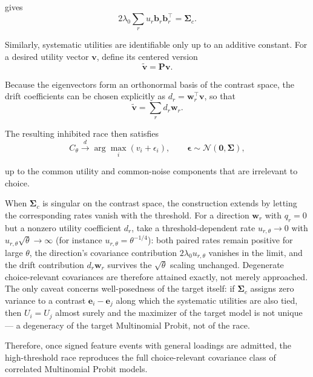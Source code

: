 \documentclass[
  man,
  floatsintext,
  longtable,
  a4paper,
  nolmodern,
  notxfonts,
  notimes,
  colorlinks=true,linkcolor=blue,citecolor=blue,urlcolor=blue]{apa7}
\begin{document}
gives \[
2\lambda_0
\sum_r
u_r\mathbf b_r\mathbf b_r^\top
=
\boldsymbol\Sigma_c.
\]

Similarly, systematic utilities are identifiable only up to an additive
constant. For a desired utility vector \(\mathbf v\), define its
centered version \[
\widetilde{\mathbf v}
=
\mathbf P\mathbf v.
\]

Because the eigenvectors form an orthonormal basis of the contrast
space, the drift coefficients can be chosen explicitly as
\(d_r=\mathbf w_r^\top\mathbf v\), so that \[
\widetilde{\mathbf v}
=
\sum_r d_r\mathbf w_r.
\]

The resulting inhibited race then satisfies \[
C_\theta
\xrightarrow{d}
\arg\max_i
\left(
v_i+\epsilon_i
\right),
\qquad
\boldsymbol\epsilon
\sim
\mathcal N(\mathbf 0,\boldsymbol\Sigma),
\]

up to the common utility and common-noise components that are irrelevant
to choice.

When \(\boldsymbol\Sigma_c\) is singular on the contrast space, the
construction extends by letting the corresponding rates vanish with the
threshold. For a direction \(\mathbf w_r\) with \(q_r=0\) but a nonzero
utility coefficient \(d_r\), take a threshold-dependent rate
\(u_{r,\theta}\to 0\) with \(u_{r,\theta}\sqrt{\theta}\to\infty\) (for
instance \(u_{r,\theta}=\theta^{-1/4}\)): both paired rates remain
positive for large \(\theta\), the direction's covariance contribution
\(2\lambda_0 u_{r,\theta}\) vanishes in the limit, and the drift
contribution \(d_r\mathbf w_r\) survives the \(\sqrt{\theta}\) scaling
unchanged. Degenerate choice-relevant covariances are therefore attained
exactly, not merely approached. The only caveat concerns well-posedness
of the target itself: if \(\boldsymbol\Sigma_c\) assigns zero variance
to a contrast \(\mathbf e_i-\mathbf e_j\) along which the systematic
utilities are also tied, then \(U_i=U_j\) almost surely and the
maximizer of the target model is not unique --- a degeneracy of the
target Multinomial Probit, not of the race.

Therefore, once signed feature events with general loadings are
admitted, the high-threshold race reproduces the full choice-relevant
covariance class of correlated Multinomial Probit models.
\end{document}
